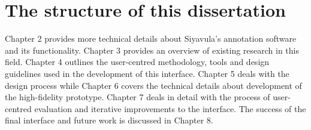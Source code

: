 
\section{The structure of this dissertation}

Chapter 2 provides more technical details about Siyavula's annotation software and its functionality. Chapter 3 provides an overview of existing research in this field. Chapter 4 outlines the user-centred methodology, tools and design guidelines used in the development of this interface. Chapter 5 deals with the design process while Chapter 6 covers the technical details about development of the high-fidelity prototype. Chapter 7 deals in detail with the process of user-centred evaluation and iterative improvements to the interface. The success of the final interface and future work is discussed in Chapter 8.   
